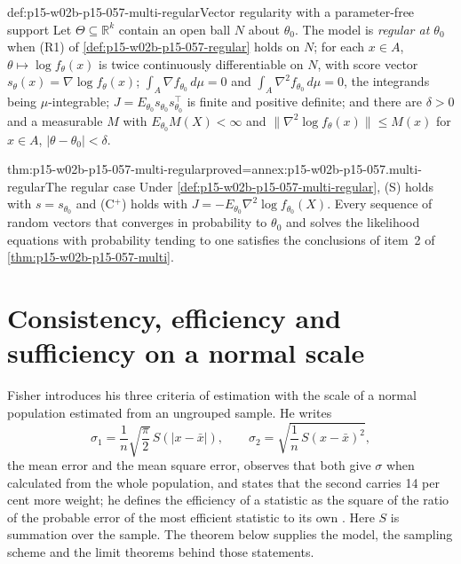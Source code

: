 \begin{hbdefinition}{def:p15-w02b-p15-057-multi-regular}{Vector regularity with a parameter-free support}
Let \(\Theta\subseteq\mathbb R^k\) contain an open ball \(N\) about
\(\theta_0\). The model is \emph{regular at \(\theta_0\)} when (R1) of
\cref{def:p15-w02b-p15-057-regular} holds on \(N\); for each \(x\in A\),
\(\theta\mapsto\log f_\theta(x)\) is twice continuously differentiable on
\(N\), with score vector \(s_\theta(x)=\nabla\log f_\theta(x)\);
\(\int_A\nabla f_{\theta_0}\,d\mu=0\) and
\(\int_A\nabla^2f_{\theta_0}\,d\mu=0\), the integrands being
\(\mu\)-integrable; \(J=E_{\theta_0}s_{\theta_0}s_{\theta_0}^{\top}\) is
finite and positive definite; and there are \(\delta>0\) and a measurable
\(M\) with \(E_{\theta_0}M(X)<\infty\) and
\(\|\nabla^2\log f_\theta(x)\|\leq M(x)\) for \(x\in A\),
\(|\theta-\theta_0|<\delta\).
\end{hbdefinition}

\begin{hbcorollary}{thm:p15-w02b-p15-057-multi-regular}{proved=annex:p15-w02b-p15-057.multi-regular}{The regular case}
Under \cref{def:p15-w02b-p15-057-multi-regular}, (S) holds with
\(s=s_{\theta_0}\) and (C\(^{+}\)) holds with
\(J=-E_{\theta_0}\nabla^2\log f_{\theta_0}(X)\). Every sequence of
random vectors that converges in probability to \(\theta_0\) and solves the
likelihood equations with probability tending to one satisfies the
conclusions of item~2 of \cref{thm:p15-w02b-p15-057-multi}.
\end{hbcorollary}

\section{Consistency, efficiency and sufficiency on a normal scale}
\label{sec:p15-w02b-p15-057-criteria}

Fisher introduces his three criteria of estimation with the scale of a
normal population estimated from an ungrouped sample. He writes
\[
 \sigma_1=\frac1n\sqrt{\frac\pi2}\,S(|x-\bar x|),\qquad
 \sigma_2=\sqrt{\frac1n\,S(x-\bar x)^2},
\]
the mean error and the mean square error, observes that both give
\(\sigma\) when calculated from the whole population, and states that the
second carries 14 per cent more weight; he defines the efficiency of a
statistic as the square of the ratio of the probable error of the most
efficient statistic to its own \cite[p.~316]{Fisher1922Foundations}.
Here \(S\) is summation over the sample. The theorem below supplies the
model, the sampling scheme and the limit theorems behind those
statements.

